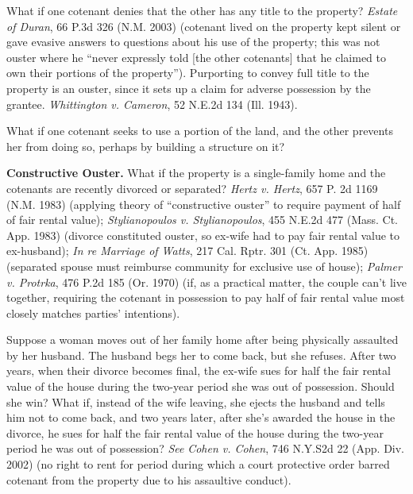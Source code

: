 What if one cotenant denies that the other has any title to the property?
\emph{Estate of Duran}, 66 P.3d 326 (N.M. 2003) (cotenant lived on the property
kept silent or gave evasive answers to questions about his use of the property;
this was not ouster where he ``never expressly told [the other cotenants] that
he claimed to own their portions of the property''). Purporting to convey full
title to the property is an ouster, since it sets up a claim for adverse
possession by the grantee. \emph{Whittington v. Cameron}, 52 N.E.2d 134 (Ill.
1943).




What if one cotenant seeks to use a portion of the land, and the other prevents
her from doing so, perhaps by building a structure on it?



\item \textbf{Constructive Ouster.} What if the property is a single-family home
and the cotenants are recently divorced or separated? \emph{Hertz v. Hertz},
657 P. 2d 1169 (N.M. 1983) (applying theory of ``constructive ouster'' to
require payment of half of fair rental value); \emph{Stylianopoulos v.
Stylianopoulos}, 455 N.E.2d 477 (Mass. Ct. App. 1983) (divorce constituted
ouster, so ex-wife had to pay fair rental value to ex-husband); \emph{In re
Marriage of Watts}, 217 Cal. Rptr. 301 (Ct. App. 1985) (separated spouse must
reimburse community for exclusive use of house); \emph{Palmer v. Protrka}, 476
P.2d 185 (Or. 1970) (if, as a practical matter, the couple can't live together,
requiring the cotenant in possession to pay half of fair rental value most
closely matches parties' intentions).


Suppose a woman moves out of her family home after being physically assaulted by
her husband. The husband begs her to come back, but she refuses. After two
years, when their divorce becomes final, the ex-wife sues for half the fair
rental value of the house during the two-year period she was out of possession.
 Should she win? What if, instead of the wife leaving, she ejects the husband
and tells him not to come back, and two years later, after she's awarded the
house in the divorce, he sues for half the fair rental value of the house
during the two-year period he was out of possession? \emph{See} \emph{Cohen v.
Cohen}, 746 N.Y.S2d 22 (App. Div. 2002) (no right to rent for period during
which a court protective order barred cotenant from the property due to his
assaultive conduct).



